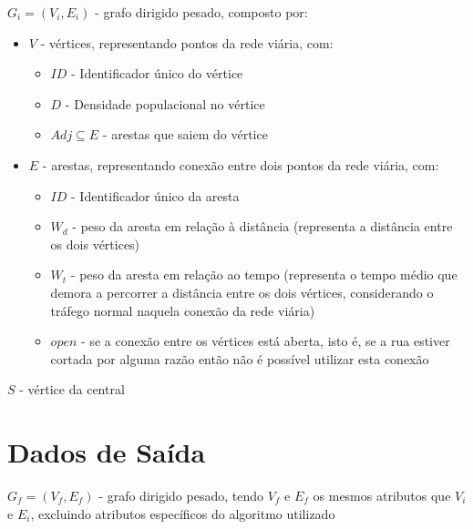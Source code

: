 \documentclass[article, a4paper, 12pt, oneside]{memoir}
\begin{document}
$G_i = (V_i, E_i)$ - grafo dirigido pesado, composto por:
\begin{itemize}
	\item $V$ - vértices, representando pontos da rede viária, com:
		\begin{itemize}
			\item $ID$ - Identificador único do vértice
			\item $D$ - Densidade populacional no vértice
			\item $Adj \subseteq E$ - arestas que saiem do vértice
		\end{itemize}
	\item $E$ - arestas, representando conexão entre dois pontos da rede viária, com:
		\begin{itemize}
			\item $ID$ - Identificador único da aresta
			\item $W_d$ - peso da aresta em relação à distância (representa a distância entre os dois vértices)
			\item $W_t$ - peso da aresta em relação ao tempo (representa o tempo médio que demora a percorrer a distância entre os dois vértices, considerando o tráfego normal naquela conexão da rede viária)
			\item $open$ - se a conexão entre os vértices está aberta, isto é, se a rua estiver cortada por alguma razão então não é possível utilizar esta conexão
		\end{itemize}
\end{itemize}

$S$ - vértice da central

\section{Dados de Saída}

$G_f = (V_f, E_f)$ - grafo dirigido pesado, tendo $V_f$ e $E_f$ os mesmos atributos que $V_i$ e $E_i$, excluindo atributos específicos do algoritmo utilizado
\end{document}
